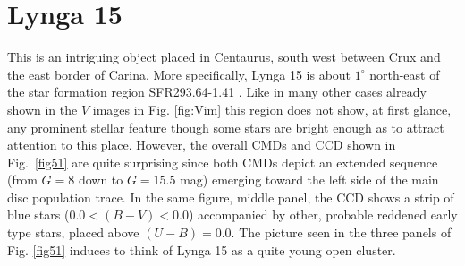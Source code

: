 \documentclass[draft]{aa}
\begin{document}
\section{Lynga 15}

This is an intriguing object placed in Centaurus, south west between Crux and
the east border of Carina. More specifically, Lynga 15 is about $1^\circ$
north-east of the star formation region SFR293.64-1.41 \citep{Avedisova_2002}.
Like in many other cases already shown in the $V$ images in Fig. \ref{fig:Vim}
this region does not show, at first glance, any prominent stellar feature
though some stars are bright enough as to attract attention to this place.
%
However, the overall CMDs and CCD shown in Fig.~\ref{fig51}
are quite surprising since both CMDs depict an extended sequence (from $G=8$
down to $G=15.5$ mag) emerging toward the left side of the main disc population
trace. In the same figure, middle panel, the CCD shows a strip of blue stars
($0.0<(B-V)<0.0$) accompanied by other, probable reddened early type stars,
placed above $(U-B) = 0.0$. The picture seen in the three panels of Fig.
\ref{fig51} induces to think of Lynga 15 as a quite young open cluster.\\
\end{document}
